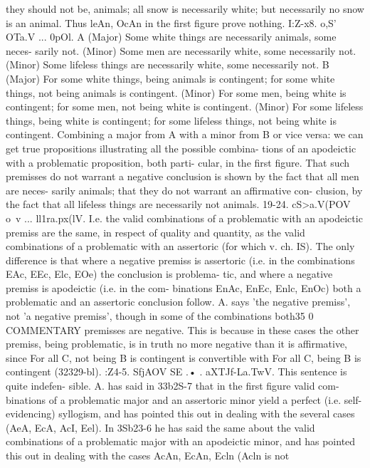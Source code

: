 {{{{{{{they should not be, animals; all snow is necessarily white; but
necessarily no snow is an animal. Thus leAn, OcAn in the first
figure prove nothing.
I:Z-x8. o{,S' OTa.V ... 0pOl.
A
(Major) Some white things are necessarily animals, some neces-
sarily not.
(Minor) Some men are necessarily white, some necessarily not.
(Minor) Some lifeless things are necessarily white, some
necessarily not.
B
(Major) For some white things, being animals is contingent; for
some white things, not being animals is contingent.
(Minor) For some men, being white is contingent; for some men,
not being white is contingent.
(Minor) For some lifeless things, being white is contingent; for
some lifeless things, not being white is contingent.
Combining a major from A with a minor from B or vice versa:
we can get true propositions illustrating all the possible combina-
tions of an apodeictic with a problematic proposition, both parti-
cular, in the first figure. That such premisses do not warrant a
negative conclusion is shown by the fact that all men are neces-
sarily animals; that they do not warrant an affirmative con-
clusion, by the fact that all lifeless things are necessarily not
animals.
19-24. cS>a.V(POV o~v ... ll1ra.px(lV. I.e. the valid combinations
of a problematic with an apodeictic premiss are the same, in
respect of quality and quantity, as the valid combinations of a
problematic with an assertoric (for which v. ch. IS). The only
difference is that where a negative premiss is assertoric (i.e. in
the combinations EAc, EEc, Elc, EOe) the conclusion is problema-
tic, and where a negative premiss is apodeictic (i.e. in the com-
binations EnAc, EnEc, Enlc, EnOc) both a problematic and an
assertoric conclusion follow. A. says 'the negative premiss', not
'a negative premiss', though in some of the combinations both35 0
COMMENTARY
premisses are negative. This is because in these cases the other
premiss, being problematic, is in truth no more negative than it is
affirmative, since For all C, not being B is contingent is convertible
with For all C, being B is contingent (32329-bl).
:Z4-5. SfjAOV SE .• . aXTJf-La.TwV. This sentence is quite indefen-
sible. A. has said in 33b2S-7 that in the first figure valid com-
binations of a problematic major and an assertoric minor yield
a perfect (i.e. self-evidencing) syllogism, and has pointed this
out in dealing with the several cases (AeA, EcA, AcI, Eel). In
3Sb23-6 he has said the same about the valid combinations of a
problematic major with an apodeictic minor, and has pointed
this out in dealing with the cases AcAn, EcAn, Ecln (Acln is not
}}}}}}}}
